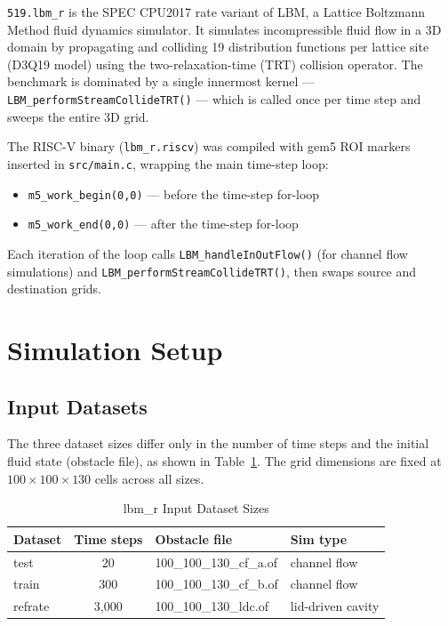 \documentclass[conference]{IEEEtran}
\begin{document}
\texttt{519.lbm\_r} is the SPEC CPU2017 rate variant of LBM, a
Lattice Boltzmann Method fluid dynamics simulator. It simulates
incompressible fluid flow in a 3D domain by propagating and
colliding 19 distribution functions per lattice site (D3Q19 model)
using the two-relaxation-time (TRT) collision operator. The benchmark
is dominated by a single innermost kernel ---
\texttt{LBM\_performStreamCollideTRT()} --- which is called once per
time step and sweeps the entire 3D grid.

The RISC-V binary (\texttt{lbm\_r.riscv}) was compiled with gem5 ROI
markers inserted in \texttt{src/main.c}, wrapping the main time-step
loop:

\begin{itemize}
    \item \texttt{m5\_work\_begin(0,0)} --- before the time-step for-loop
    \item \texttt{m5\_work\_end(0,0)}   --- after the time-step for-loop
\end{itemize}

Each iteration of the loop calls \texttt{LBM\_handleInOutFlow()} (for
channel flow simulations) and \texttt{LBM\_performStreamCollideTRT()},
then swaps source and destination grids.

\section{Simulation Setup}

\subsection{Input Datasets}

The three dataset sizes differ only in the number of time steps
and the initial fluid state (obstacle file), as shown in
Table~\ref{tab:inputs}. The grid dimensions are fixed at
$100 \times 100 \times 130$ cells across all sizes.

\begin{table}[H]
\centering
\caption{lbm\_r Input Dataset Sizes}
\label{tab:inputs}
\begin{tabular}{lcll}
\toprule
\textbf{Dataset} & \textbf{Time steps} & \textbf{Obstacle file} & \textbf{Sim type} \\
\midrule
test    &    20 & 100\_100\_130\_cf\_a.of & channel flow \\
train   &   300 & 100\_100\_130\_cf\_b.of & channel flow \\
refrate & 3,000 & 100\_100\_130\_ldc.of  & lid-driven cavity \\
\bottomrule
\end{tabular}
\end{table}
\end{document}
